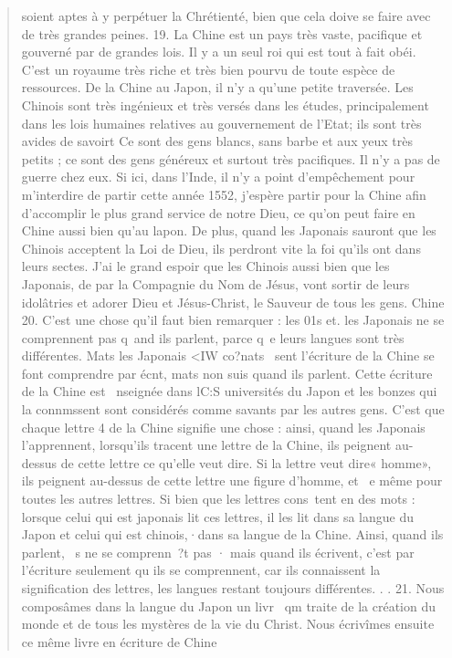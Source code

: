\begin{quote}
soient aptes à y perpétuer la Chrétienté, bien que cela doive se faire
avec de très grandes peines.
19. La Chine est un pays très vaste, pacifique et gouverné par
de grandes lois. Il y a un seul roi qui est tout à fait obéi. C'est un
royaume très riche et très bien pourvu de toute espèce de ressources.
De la Chine au Japon, il n'y a qu'une petite traversée. Les Chinois
sont très ingénieux et très versés dans les études, principalement
dans les lois humaines relatives au gouvernement de l'Etat;
ils sont très avides de savoirt Ce sont des gens blancs, sans barbe
et aux yeux très petits ; ce sont des gens généreux et surtout très
pacifiques. Il n'y a pas de guerre chez eux. Si ici, dans l'Inde, il
n'y a point d'empêchement pour m'interdire de partir cette année
1552, j'espère partir pour la Chine afin d'accomplir le plus grand
service de notre Dieu, ce qu'on peut faire en Chine aussi bien qu'au
lapon. De plus, quand les Japonais sauront que les Chinois acceptent
la Loi de Dieu, ils perdront vite la foi qu'ils ont dans leurs sectes.
J'ai le grand espoir que les Chinois aussi bien que les Japonais,
de par la Compagnie du Nom de Jésus, vont sortir de leurs
    idolâtries et adorer Dieu et Jésus-Christ, le Sauveur de tous les
gens. Chine
20. C'est une chose qu'il faut bien remarquer : les 01s et.
les Japonais ne se comprennent pas q~and ils parlent, parce q~e
leurs langues sont très différentes. Mats les Japonais <IW co?nats~
sent l'écriture de la Chine se font comprendre par écnt, mats non suis
quand ils parlent. Cette écriture de la Chine est ~nseignée dans lC:S
universités du Japon et les bonzes qui la connmssent sont considérés
comme savants par les autres gens. C'est que chaque lettre 4
de la Chine signifie une chose : ainsi, quand les Japonais l'apprennent,
lorsqu'ils tracent une lettre de la Chine, ils peignent au-dessus
de cette lettre ce qu'elle veut dire. Si la lettre veut dire« homme»,
ils peignent au-dessus de cette lettre une figure d'homme, et ~e
même pour toutes les autres lettres. Si bien que les lettres cons~tent
en des mots : lorsque celui qui est japonais lit ces lettres, il
les lit dans sa langue du Japon et celui qui est chinois,·dans sa langue
de la Chine. Ainsi, quand ils parlent, ~s ne se comprenn~?t
pas · mais quand ils écrivent, c'est par l'écriture seulement qu ils
se comprennent, car ils connaissent la signification des lettres, les
langues restant toujours différentes. . .
21. Nous composâmes dans la langue du Japon un livr~ qm
traite de la création du monde et de tous les mystères de la vie du
Christ. Nous écrivîmes ensuite ce même livre en écriture de Chine

\end{quote}
